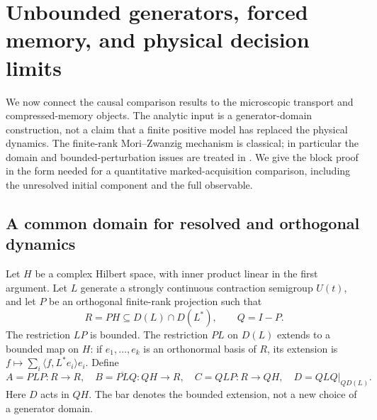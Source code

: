 \section{Unbounded generators, forced memory, and physical decision limits}
\label{sec:v12-memory}

We now connect the causal comparison results to the microscopic transport
and compressed-memory objects. The analytic input is a generator-domain
construction, not a claim that a finite positive model has replaced the
physical dynamics. The finite-rank Mori--Zwanzig mechanism is classical;
in particular the domain and bounded-perturbation issues are treated in
\cite{WidderZimmerSchilling2025,WidderSchilling2026}. We give the block
proof in the form needed for a quantitative marked-acquisition comparison,
including the unresolved initial component and the full observable.

\subsection{A common domain for resolved and orthogonal dynamics}
Let $H$ be a complex Hilbert space, with inner product linear in the first
argument. Let $L$ generate a strongly continuous contraction semigroup
$U(t)$, and let $P$ be an orthogonal finite-rank projection such that
\begin{equation}
 R=PH\subseteq D(L)\cap D(L^*),\qquad Q=I-P.
 \label{eq:v12-domain}
\end{equation}
The restriction $LP$ is bounded. The restriction $PL$ on $D(L)$ extends
to a bounded map on $H$: if $e_1,\ldots,e_k$ is an orthonormal basis of
$R$, its extension is $f\mapsto\sum_i\langle f,L^*e_i\rangle e_i$.
Define
\begin{equation}
 A=PLP:R\to R,\quad B=\overline{PL}Q:QH\to R,
 \quad C=QLP:R\to QH,\quad D=QLQ\big|_{QD(L)}.
 \label{eq:v12-blocks}
\end{equation}
Here $D$ acts in $QH$. The bar denotes the bounded extension, not a
new choice of a generator domain.

